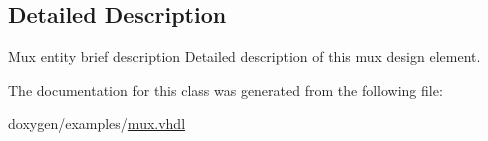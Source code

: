 \subsection{Detailed Description}
Mux entity brief description Detailed description of this mux design element. 

The documentation for this class was generated from the following file\+:\begin{DoxyCompactItemize}
\item 
doxygen/examples/\mbox{\hyperlink{mux_8vhdl}{mux.\+vhdl}}\end{DoxyCompactItemize}
